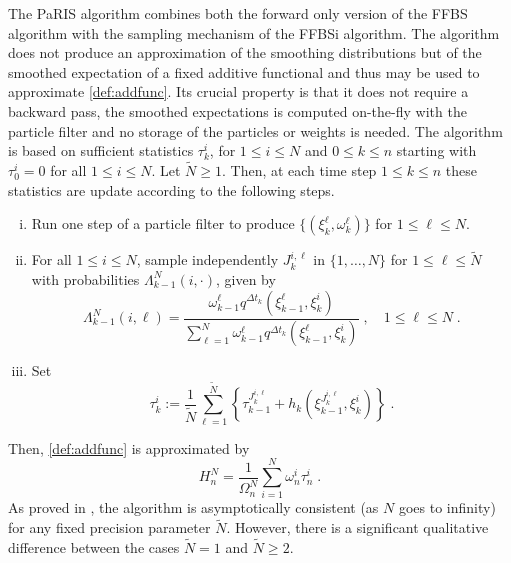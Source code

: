 \documentclass[12pt]{article}
\newcommand{\eqsp}{\;}
\newcommand{\1}{\mathrm{1}}
\begin{document}
The PaRIS algorithm combines both the forward only version of the FFBS algorithm with the sampling mechanism of the FFBSi algorithm. The algorithm does not produce an approximation of the smoothing distributions but of the smoothed expectation of a fixed additive functional and thus  may be used to approximate \eqref{def:addfunc}. Its crucial property is that it does not require a backward pass, the smoothed expectations is computed on-the-fly with the particle filter and no storage of the particles or weights is needed. The algorithm is based on sufficient statistics $\tau^i_k$, for $1\le i\le N$ and $0\le k \le n$ starting with $\tau^i_0 = 0$ for all $1\le i\le N$. Let $\tilde{N}\ge 1$. Then, at each time step $1\le k \le n$ these statistics are update according to the following steps.
\begin{enumerate}[(i)]
\item \label{it:PaRIS:filt} Run one step of a particle filter to produce $\{(\xi^{\ell}_k, \omega^{\ell}_k)\}$ for $1\le \ell \le N$.
\item \label{it:PaRIS:sampleindex} For all $1\le i \le N$, sample independently $J_k^{i,\ell}$ in $\{1,\ldots,N\}$ for $1\le \ell \le \widetilde N$ with probabilities $\Lambda_{k-1}^N(i,\cdot)$, given by
\[
\Lambda_{k-1}^N(i,\ell) = \frac{\omega^{\ell}_{k-1} q^{\Delta t_k}(\xi^{\ell}_{k-1},\xi_k^{i})}{\sum_{\ell=1}^N\omega^{\ell}_{k-1} q^{\Delta t_k}(\xi^{\ell}_{k-1},\xi_k^{i})}\eqsp,\quad 1\le \ell\le N\eqsp.
\]
\item \label{it:PaRIS:smooth} Set
\[
\tau^{i}_{k} := \frac{1}{\widetilde{N}} \sum^{\widetilde{N}}_{\ell=1} \left\{ \tau^{J_k^{i,\ell}}_{k-1} + h_{k} \left(\xi^{J_k^{i,\ell}}_{k-1}, \xi^{i}_{k}\right)  \right\}\eqsp.
\]
\end{enumerate}
Then, \eqref{def:addfunc} is approximated by
\[
H_n^N = \frac{1}{\Omega_n^N}\sum_{i=1}^N \omega^{i}_n \tau_n^i\eqsp.
\] 
As proved in \cite{olsson:westerborn:2016}, the algorithm is asymptotically consistent (as $N$ goes to infinity) for any fixed precision parameter $\tilde N$. However, there is a significant qualitative difference between the cases $\tilde{N} = 1$ and $\tilde{N} \geq 2$.
\end{document}
